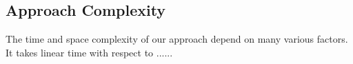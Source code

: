 



\subsection{Approach Complexity}

The time and space complexity of our approach depend on many various factors. It takes linear time with respect to ......
